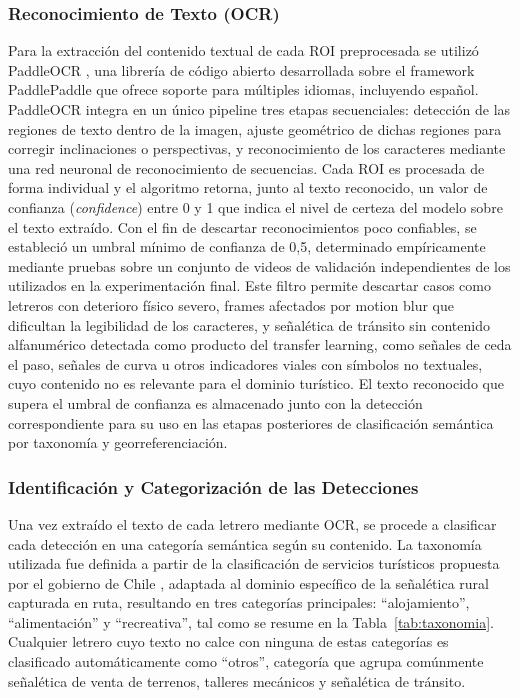\documentclass[runningheads]{llncs}
\begin{document}
\subsubsection{Reconocimiento de Texto (OCR)}
\label{subsec:reconocimiento-ocr}
Para la extracción del contenido textual de cada ROI preprocesada se 
utilizó PaddleOCR \cite{paddleocr,paddleocr2}, una librería de código abierto 
desarrollada sobre el framework PaddlePaddle \cite{paddlepaddle} que ofrece soporte para múltiples idiomas, incluyendo español. PaddleOCR integra en un único 
pipeline tres etapas secuenciales: detección de las regiones de texto 
dentro de la imagen, ajuste geométrico de dichas regiones para 
corregir inclinaciones o perspectivas, y reconocimiento de los 
caracteres mediante una red neuronal de reconocimiento de secuencias. 
Cada ROI es procesada de forma individual y el algoritmo retorna, junto 
al texto reconocido, un valor de confianza (\textit{confidence}) entre 
0 y 1 que indica el nivel de certeza del modelo sobre el texto extraído. Con el fin de descartar reconocimientos 
poco confiables, se estableció un umbral mínimo de confianza de 0,5, 
determinado empíricamente mediante pruebas sobre un conjunto de videos 
de validación independientes de los utilizados en la experimentación 
final. Este filtro permite descartar casos como letreros con deterioro físico 
severo, frames afectados por motion blur que dificultan la 
legibilidad de los caracteres, y señalética de tránsito sin contenido 
alfanumérico detectada como producto del transfer learning, como señales 
de ceda el paso, señales de curva u otros indicadores viales con 
símbolos no textuales, cuyo contenido no es relevante para el dominio 
turístico. El texto reconocido que supera el umbral de confianza es 
almacenado junto con la detección correspondiente para su uso en las 
etapas posteriores de clasificación semántica por taxonomía y 
georreferenciación.

\subsubsection{Identificación y Categorización de las Detecciones}
Una vez extraído el texto de cada letrero mediante OCR, se procede a 
clasificar cada detección en una categoría semántica según su contenido. 
La taxonomía utilizada fue definida a partir de la clasificación de 
servicios turísticos propuesta por el gobierno de Chile 
\cite{taxonomia-gobierno}, adaptada al dominio específico de la 
señalética rural capturada en ruta, resultando en tres categorías 
principales: ``alojamiento'', ``alimentación'' y ``recreativa'', 
tal como se resume en la Tabla~\ref{tab:taxonomia}. Cualquier letrero 
cuyo texto no calce con ninguna de estas categorías es clasificado 
automáticamente como ``otros'', categoría que agrupa comúnmente 
señalética de venta de terrenos, talleres mecánicos y señalética 
de tránsito.
\end{document}
